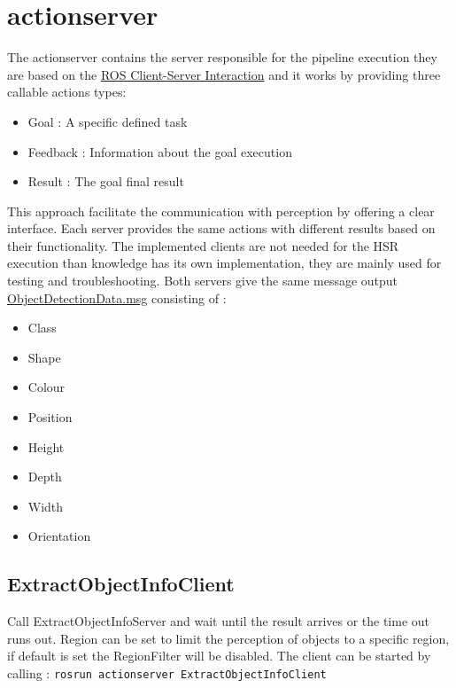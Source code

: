 \documentclass[main.tex]{subfiles}
\begin{document}
		\section{actionserver}
The actionserver contains the server responsible for the pipeline execution they are based on the \href{http://wiki.ros.org/actionlib}{ROS Client-Server Interaction} and it works by providing three callable actions types:
\begin{itemize}
	\item Goal : A specific defined task 
	\item Feedback : Information about the goal execution  
	\item Result : The goal final result 
\end{itemize}
This approach facilitate the communication with perception by offering a clear interface.
Each server provides the same actions with different results based on their functionality.
The implemented clients are not needed for the HSR execution than knowledge has its own implementation, they are mainly used for testing and troubleshooting. 
Both servers give the same message output \href{https://github.com/SUTURO/suturo_resources/blob/master/messages/suturo_perception_msgs/msg/ObjectDetectionData.msg}{ObjectDetectionData.msg} consisting of : 

	\begin{itemize}
	\item Class
	\item Shape
	\item Colour
	\item Position
	\item Height
	\item Depth
	\item Width
	\item Orientation
	\end{itemize}

			\subsection{ExtractObjectInfoClient}
Call ExtractObjectInfoServer and wait until the result arrives or the time out runs out. Region can be set to limit the perception of objects to a specific region, if default is set the RegionFilter will be disabled. The client can be started by calling : \texttt{rosrun actionserver ExtractObjectInfoClient}
\end{document}
